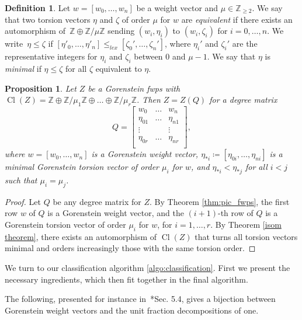 \documentclass{amsart}
\DeclareMathOperator{\Cl}{Cl}
\newcommand{\Z}{\mathbb{Z}}
\newtheorem{proposition}[lem]{Proposition}
\theoremstyle{definition}
\newtheorem{definition}[lem]{Definition}
\begin{document}
    \begin{definition}
    Let $w=[w_0,\dots,w_n]$ be a weight vector and $\mu\in\Z_{\geq 2}$. We say that two torsion vectors $\eta$ and $\zeta$ of order $\mu$ for $w$ are \emph{equivalent} if there exists an automorphism of~$\Z\oplus\Z/\mu\Z$ sending $(w_i,\eta_i)$ to $(w_i,\zeta_i)$ for $i=0,\dots,n$. We write~$\eta\leq\zeta$ if $[\eta'_0,\dots,\eta'_n]\leq_{lex}[\zeta_0',\dots,\zeta_n']$, where $\eta_i'$ and $\zeta_i'$ are the representative integers for $\eta_i$ and $\zeta_i$ between $0$ and $\mu-1$. We say that $\eta$ is \emph{minimal} if $\eta\leq\zeta$ for all $\zeta$ equivalent to $\eta$.
\end{definition}

\begin{proposition}\label{prop:gor_matrix}
    Let $Z$ be a Gorenstein fwps with $\Cl(Z)=\Z\oplus\Z/\mu_1\Z\oplus\dots\oplus\Z/\mu_r\Z$. Then $Z=Z(Q)$ for a degree matrix $$Q=\begin{bmatrix}
        w_0 & \dots & w_n\\
        \eta_{01} & \dots & \eta_{n1} \\
        \vdots & & \vdots \\
        \eta_{0r} & \dots & \eta_{nr} \\
    \end{bmatrix},$$
    where $w=[w_0,\dots,w_n]$ is a Gorenstein weight vector, $\eta_{\ast i}\coloneqq[\eta_{0i},\dots,\eta_{ni}]$ is a minimal Gorenstein torsion vector of order $\mu_i$ for $w$, and $\eta_{\ast i}< \eta_{\ast j}$ for all $i<j$ such that $\mu_i=\mu_j$.
\end{proposition}

\begin{proof}
    Let $Q$ be any degree matrix for $Z$. By Theorem \ref{thm:pic_fwps}, the first row $w$ of $Q$ is a Gorenstein weight vector, and the $(i+1)$-th row of $Q$ is a Gorenstein torsion vector of order $\mu_i$ for $w$, for $i=1,\dots,r$. By Theorem \ref{isom theorem}, there exists an automorphism of $\Cl(Z)$ that turns all torsion vectors minimal and orders increasingly those with the same torsion order.
\end{proof}

We turn to our classification algorithm \ref{algo:classification}.
First we present the necessary ingredients, which then fit together in the final algorithm.

The following, presented for instance in~\cite{B}*{Sec. 5.4}, gives a bijection between Gorenstein weight vectors and the unit fraction decompositions of one.
\end{document}
